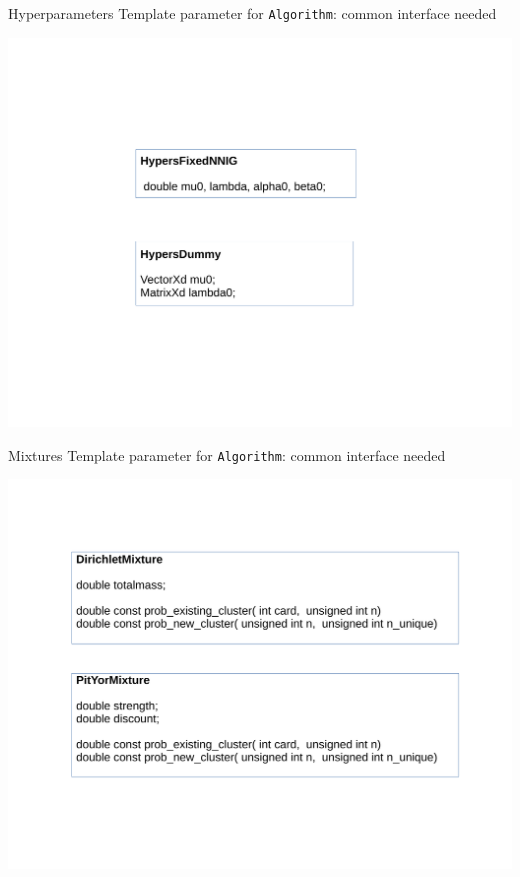 \begin{frame}{Hyperparameters}
Template parameter for \texttt{Algorithm}: common interface needed
\begin{center}
	\includegraphics[scale=0.35]{etc/hypers.pdf}
\end{center}
\end{frame}

\begin{frame}{Mixtures}
Template parameter for \texttt{Algorithm}: common interface needed
\begin{center}
	\includegraphics[scale=0.35]{etc/mixture.pdf}
\end{center}

\end{frame}